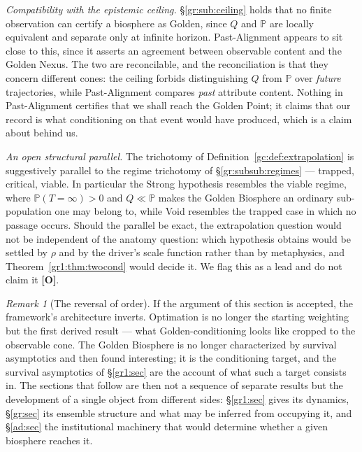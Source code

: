 \documentclass[11pt]{article}
\numberwithin{equation}{section}
\theoremstyle{plain}
\theoremstyle{definition}
\theoremstyle{remark}
\newtheorem{remark}[theorem]{Remark}
\newcommand{\PP}{\mathbb{P}}
\begin{document}
\emph{Compatibility with the epistemic ceiling.}
\S\ref{gr:sub:ceiling} holds that no finite observation can certify a
biosphere as Golden, since $Q$ and $\PP$ are locally equivalent and
separate only at infinite horizon. Past-Alignment appears to sit close
to this, since it asserts an agreement between observable content and
the Golden Nexus. The two are reconcilable, and the reconciliation is
that they concern different cones: the ceiling forbids distinguishing
$Q$ from $\PP$ over \emph{future} trajectories, while Past-Alignment
compares \emph{past} attribute content. Nothing in Past-Alignment
certifies that we shall reach the Golden Point; it claims that our
record is what conditioning on that event would have produced, which is
a claim about behind us.

\emph{An open structural parallel.} The trichotomy of
Definition~\ref{gc:def:extrapolation} is suggestively parallel to the
regime trichotomy of \S\ref{gr:subsub:regimes} --- trapped, critical,
viable. In particular the Strong hypothesis resembles the viable
regime, where $\PP(T=\infty)>0$ and $Q\ll\PP$ makes the Golden Biosphere
an ordinary sub-population one may belong to, while Void resembles the
trapped case in which no passage occurs. Should the parallel be exact,
the extrapolation question would not be independent of the anatomy
question: which hypothesis obtains would be settled by $\rho$ and by the
driver's scale function rather than by metaphysics, and
Theorem~\ref{gr1:thm:twocond} would decide it. We flag this as a lead
and do not claim it \textbf{[O]}.

\begin{remark}[The reversal of order]\label{gc:rem:reversal}
If the argument of this section is accepted, the framework's
architecture inverts. Optimation is no longer the starting weighting but
the first derived result --- what Golden-conditioning looks like cropped
to the observable cone. The Golden Biosphere is no longer characterized
by survival asymptotics and then found interesting; it is the
conditioning target, and the survival asymptotics of
\S\ref{gr1:sec} are the account of what such a target consists in. The
sections that follow are then not a sequence of separate results but the
development of a single object from different sides: \S\ref{gr1:sec}
gives its dynamics, \S\ref{gr:sec} its ensemble structure and what may
be inferred from occupying it, and \S\ref{ad:sec} the institutional
machinery that would determine whether a given biosphere reaches it.
\end{remark}
\end{document}
